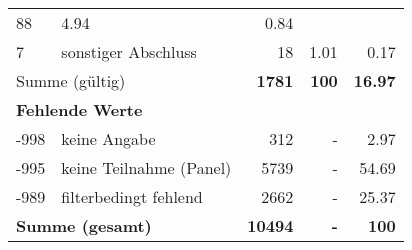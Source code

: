 \begin{longtable}{lXrrr}
       \num{88} &
       \num[round-mode=places,round-precision=2]{4.94} &
         \num[round-mode=places,round-precision=2]{0.84} \\

     7 &
     \multicolumn{1}{X}{ sonstiger Abschluss   } &


       \num{18} &
       \num[round-mode=places,round-precision=2]{1.01} &
         \num[round-mode=places,round-precision=2]{0.17} \\
     \midrule
     \multicolumn{2}{l}{Summe (gültig)} &
       \textbf{\num{1781}} &
     \textbf{\num{100}} &
       \textbf{\num[round-mode=places,round-precision=2]{16.97}} \\
     \multicolumn{5}{l}{\textbf{Fehlende Werte}}\\
       -998 &
       keine Angabe &
         \num{312} &
        - &
         \num[round-mode=places,round-precision=2]{2.97} \\
       -995 &
       keine Teilnahme (Panel) &
         \num{5739} &
        - &
         \num[round-mode=places,round-precision=2]{54.69} \\
       -989 &
       filterbedingt fehlend &
         \num{2662} &
        - &
         \num[round-mode=places,round-precision=2]{25.37} \\
     \midrule
     \multicolumn{2}{l}{\textbf{Summe (gesamt)}} &
          \textbf{\num{10494}} &
        \textbf{-} &
        \textbf{\num{100}} \\
     \bottomrule
     \end{longtable}
     
